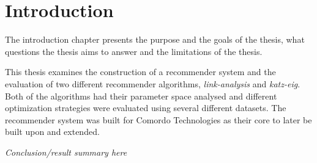 
\section{Introduction}\label{sec:intro:intro}

The introduction chapter presents the purpose and the goals of the thesis, what questions the thesis aims to answer and the limitations of the thesis.

This thesis examines the construction of a recommender system and the evaluation of two different recommender algorithms, \textit{link-analysis} and \textit{katz-eig}. Both of the algorithms had their parameter space analysed and different optimization strategies were evaluated using several different datasets. The recommender system was built for Comordo Technologies as their core to later be built upon and extended.

\textit{Conclusion/result summary here}


